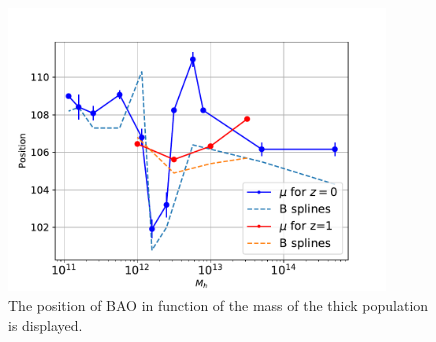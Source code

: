 \begin{figure}[htbp]
       \centering

    \includegraphics[width=100mm]{Images/chapter4/PosvsMh2.pdf}
\caption{\small The position of BAO in function of the mass of the thick population is displayed.}
       \label{hist}
 \end{figure}

